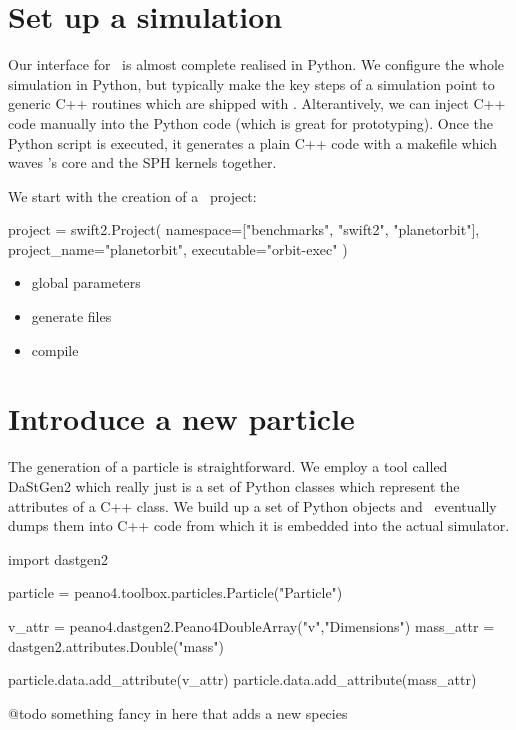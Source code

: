 \section{Set up a simulation}

Our interface for \Swift\ is almost complete realised in Python.
We configure the whole simulation in Python, but typically make the key 
steps of a simulation point to generic C++ routines which are shipped with
\Peano.
Alterantively, we can inject C++ code manually into the Python code (which is
great for prototyping).
Once the Python script is executed, it generates a plain C++ code with a
makefile which waves \Peano's core and the SPH kernels together.


We start with the creation of a \Swift\ project:
\begin{code}
project = swift2.Project( namespace=["benchmarks", "swift2", "planetorbit"], 
                          project_name="planetorbit", 
                          executable="orbit-exec" )
\end{code}


\begin{itemize}
  \item global parameters
% 
  \item generate files
  \item compile
\end{itemize}

\section{Introduce a new particle}

The generation of a particle is straightforward. We employ a tool called
DaStGen2 which really just is a set of Python classes which represent the 
attributes of a C++ class. We build up a set of Python objects and \Swift\
eventually dumps them into C++ code from which it is embedded into the 
actual simulator.   

\begin{code}
import dastgen2

particle = peano4.toolbox.particles.Particle("Particle")

v_attr = peano4.dastgen2.Peano4DoubleArray("v","Dimensions")
mass_attr = dastgen2.attributes.Double("mass")

particle.data.add_attribute(v_attr)
particle.data.add_attribute(mass_attr)


@todo something fancy in here that adds a new species
\end{code}

